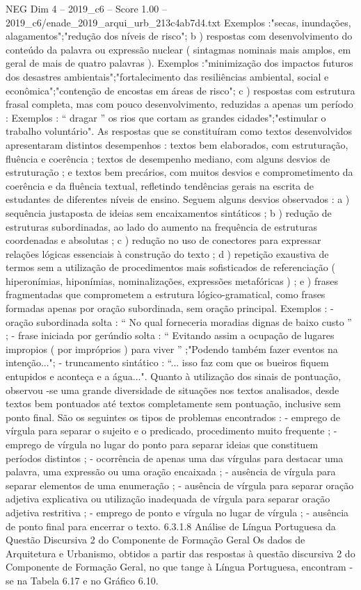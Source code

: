 \begin{textsample}{NEG Dim 4 – 2019\_c6 – Score 1.00 – 2019\_c6/enade\_2019\_arqui\_urb\_213c4ab7d4.txt}
Exemplos :"secas, inundações, alagamentos";"redução dos níveis de risco"; b ) respostas com desenvolvimento do conteúdo da palavra ou expressão nuclear ( sintagmas nominais mais amplos, em geral de mais de quatro palavras ).
Exemplos :"minimização dos impactos futuros dos desastres ambientais";"fortalecimento das resiliências ambiental, social e econômica";"contenção de encostas em áreas de risco"; c ) respostas com estrutura frasal completa, mas com pouco desenvolvimento, reduzidas a apenas um período : Exemplos : “ dragar ” os rios que cortam as grandes cidades";"estimular o trabalho voluntário".
As respostas que se constituíram como textos desenvolvidos apresentaram distintos desempenhos : textos bem elaborados, com estruturação, fluência e coerência ; textos de desempenho mediano, com alguns desvios de estruturação ; e textos bem precários, com muitos desvios e comprometimento da coerência e da fluência textual, refletindo tendências gerais na escrita de estudantes de diferentes níveis de ensino.
Seguem alguns desvios observados : a ) sequência justaposta de ideias sem encaixamentos sintáticos ; b ) redução de estruturas subordinadas, ao lado do aumento na frequência de estruturas coordenadas e absolutas ; c ) redução no uso de conectores para expressar relações lógicas essenciais à construção do texto ; d ) repetição exaustiva de termos sem a utilização de procedimentos mais sofisticados de referenciação ( hiperonímias, hiponímias, nominalizações, expressões metafóricas ) ; e ) frases fragmentadas que comprometem a estrutura lógico-gramatical, como frases formadas apenas por oração subordinada, sem oração principal.
Exemplos : - oração subordinada solta : “ No qual forneceria moradias dignas de baixo custo ” ; - frase iniciada por gerúndio solta : “ Evitando assim a ocupação de lugares impropios ( por impróprios ) para viver ” ;"Podendo também fazer eventos na intenção..."; - truncamento sintático : “... isso faz com que os bueiros fiquem entupidos e aconteça e a água...".
Quanto à utilização dos sinais de pontuação, observou -se uma grande diversidade de situações nos textos analisados, desde textos bem pontuados até textos completamente sem pontuação, inclusive sem ponto final.
São os seguintes os tipos de problemas encontrados : - emprego de vírgula para separar o sujeito e o predicado, procedimento muito frequente ; - emprego de vírgula no lugar do ponto para separar ideias que constituem períodos distintos ; - ocorrência de apenas uma das vírgulas para destacar uma palavra, uma expressão ou uma oração encaixada ; - ausência de vírgula para separar elementos de uma enumeração ; - ausência de vírgula para separar oração adjetiva explicativa ou utilização inadequada de vírgula para separar oração adjetiva restritiva ; - emprego de ponto e vírgula no lugar de vírgula ; - ausência de ponto final para encerrar o texto. 6.3.1.8 Análise de Língua Portuguesa da Questão Discursiva 2 do Componente de Formação Geral Os dados de Arquitetura e Urbanismo, obtidos a partir das respostas à questão discursiva 2 do Componente de Formação Geral, no que tange à Língua Portuguesa, encontram -se na Tabela 6.17 e no Gráfico 6.10.

\end{textsample}
